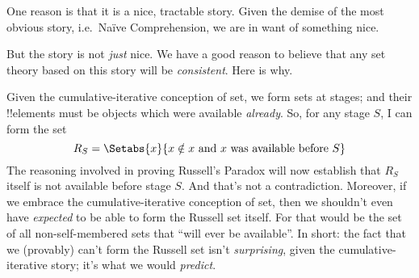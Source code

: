 \documentclass[../../../include/open-logic-section]{subfiles}
\begin{document}
One reason is that it is a nice, tractable story. Given the demise of the most obvious story, i.e.\ Na\"ive Comprehension, we are in want of something nice. 

But the story is not \emph{just} nice. We have a good reason to believe that any set theory based on this story will be \emph{consistent}. Here is why. 

Given the cumulative-iterative conception of set, we form sets at stages; and their !!{element}s must be objects which were available \emph{already}. So, for any stage $S$, I can form the set 
	$$R_S = \Setabs{x}{x \notin x\text{ and }x\text{ was available before }S}$$
The reasoning involved in proving Russell's Paradox will now establish that $R_S$ itself is not available before stage $S$. And that's not a contradiction. Moreover, if we embrace the cumulative-iterative conception of set, then we shouldn't even have \emph{expected} to be able to form the Russell set itself. For that would be the set of all non-self-membered sets that ``will ever be available''. In short: the fact that we (provably) can't form the Russell set isn't \emph{surprising}, given the cumulative-iterative story; it's what we would \emph{predict}.

%

\end{document}
